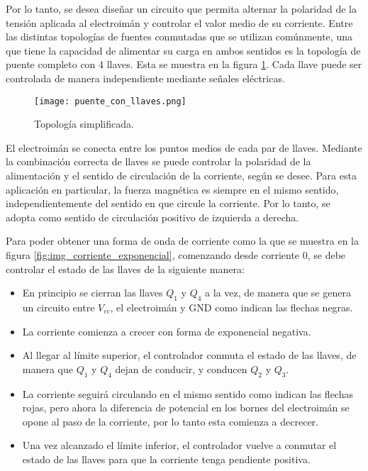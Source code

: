 Por lo tanto, se desea diseñar un circuito que permita alternar la polaridad de la tensión aplicada al electroimán y controlar el valor medio de su corriente. Entre las distintas topologías de fuentes conmutadas que se utilizan comúnmente, una que tiene la capacidad de alimentar su carga en ambos sentidos es la topología de puente completo con 4 llaves. Esta se muestra en la figura \ref{fig:img_topologia_simplificada}. Cada llave puede ser controlada de manera independiente mediante señales eléctricas.

\begin{figure}[H]
	\centering
	\texttt{[image: puente\_con\_llaves.png]}
	\caption{Topología simplificada.}
	\label{fig:img_topologia_simplificada}
\end{figure} 


El electroimán se conecta entre los puntos medios de cada par de llaves. Mediante la combinación correcta de llaves se puede controlar la polaridad de la alimentación y el sentido de circulación de la corriente, según se desee. Para esta aplicación en particular, la fuerza magnética es siempre en el mismo sentido, independientemente del sentido en que circule la corriente. Por lo tanto, se adopta como sentido de circulación positivo de izquierda a derecha.

Para poder obtener una forma de onda de corriente como la que se muestra en la figura \ref{fig:img_corriente_exponencial}, comenzando desde corriente 0, se debe controlar el estado de las llaves de la siguiente manera:

\begin{itemize}
	\item En principio se cierran las llaves $Q_1$ y $Q_4$ a la vez, de manera que se genera un circuito entre $V_{cc}$, el electroimán y GND como indican las flechas negras.
	\item La corriente comienza a crecer con forma de exponencial negativa. 
	\item Al llegar al límite superior, el controlador conmuta el estado de las llaves, de manera que $Q_1$ y $Q_4$ dejan de conducir, y conducen $Q_2$ y $Q_3$.
	\item La corriente seguirá circulando en el mismo sentido como indican las flechas rojas, pero ahora la diferencia de potencial en los bornes del electroimán se opone al paso de la corriente, por lo tanto esta comienza a decrecer.
	\item Una vez alcanzado el límite inferior, el controlador vuelve a conmutar el estado de las llaves para que la corriente tenga pendiente positiva.
\end{itemize}

